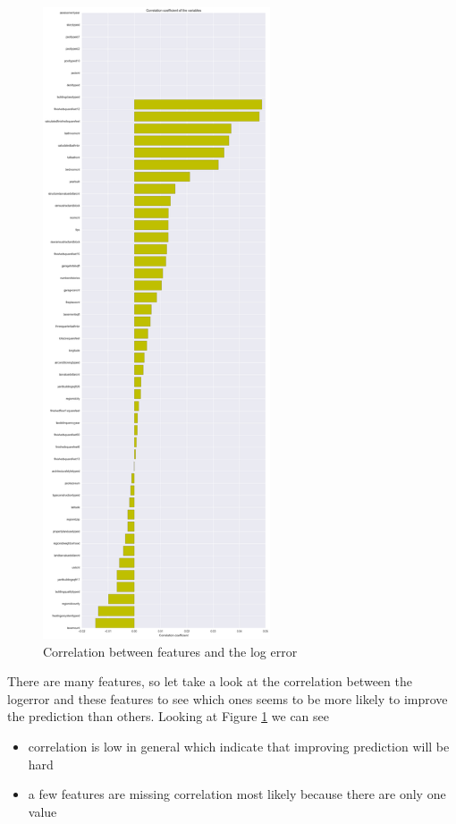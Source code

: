 \documentclass[a4paper]{article}
\begin{document}
\begin{figure}
\centering
\includegraphics[width=0.6\textwidth]{./img/prop-important.png}
\caption{\label{fig:prop-important} Correlation between features and the log error}
\end{figure}
There are many features, so let take a look at the correlation between the logerror and these features to
see which ones seems to be more likely to improve the prediction than others.
Looking at Figure \ref{fig:prop-important} we can see
\begin{itemize}
    \item correlation is low in general which indicate that improving prediction will be hard
    \item a few features are missing correlation most likely because there are only one value
\end{itemize}
\end{document}
